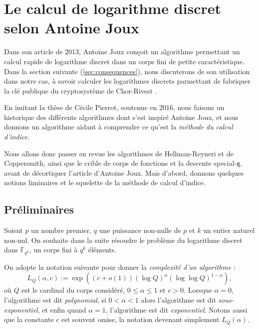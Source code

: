 \documentclass[a4paper, titlepage, 11pt]{article}
\theoremstyle{definition}
\theoremstyle{remark}
\def\o{o}
\def\gf #1{\mathbb{F}_{#1}}
\begin{document}
\section{Le calcul de logarithme discret selon Antoine Joux}\label{sec:DLPJoux}


Dans son article \cite{joux2013} de 2013, Antoine Joux conçoit un algorithme permettant un calcul rapide de logarithme discret dans un corps fini de petite caractéristique. Dans la section suivante (\ref{sec:consequences}), nous discuterons de son utilisation dans notre cas, à savoir calculer les logarithmes discrets parmettant de fabriquer la clé publique du cryptosystème de Chor-Rivest \cite{chorRivest1988}.

En imitant la thèse \cite{pierrot2016} de Cécile Pierrot, soutenue en 2016, nous faisons un historique des différents algorithmes dont s'est inspiré Antoine Joux, et nous donnons un algorithme aidant à comprendre ce qu'est la \textit{méthode du calcul d'indice}.

Nous allons donc passer en revue les algorithmes de Hellman-Reyneri et de Coppersmith, ainsi que le crible de corps de fonctions et la descente special-$\mathfrak{q}$, avant de décortiquer l'article \cite{joux2013} d'Antoine Joux. Mais d’abord, donnons quelques notions liminaires et le squelette de la méthode de calcul d’indice.

\subsection{Préliminaires}

Soient $p$ un nombre premier, $q$ une puissance non-nulle de $p$ et $k$ un entier naturel non-nul. On souhaite dans la suite résoudre le problème du logarithme discret dans $\gf{q^k}$, un corps fini à $q^k$ éléments.

On adopte la notation suivante pour donner la \textit{complexité d'un algorithme} :
$$L_{Q}(\alpha, c) := \exp\left({(c+\o(1))(\log Q)^\alpha(\log\log Q)^{1 - \alpha}}\right),$$
où $Q$ est le cardinal du corps considéré, $0 \leqslant \alpha\leqslant 1$ et $c > 0$. Lorsque $\alpha = 0$, l'algorithme est dit \textit{polynomial}, si $0 < \alpha < 1$ alors l'algorithme est dit \textit{sous-exponentiel}, et enfin quand $\alpha = 1$, l'algorithme est dit \textit{exponentiel}. Notons aussi que la constante $c$ est souvent omise, la notation devenant simplement $L_{Q}(\alpha)$.
\end{document}
